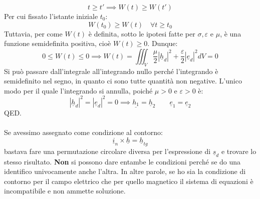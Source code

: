 \documentclass{book}
\begin{document}
        \begin{equation}
            t \geq t' \implies W(t) \geq W(t')
        \end{equation}
        Per cui fissato l'istante iniziale $t_{0}$:
        \begin{equation}
            W(t_{0}) \geq W(t) \quad \forall t \geq t_{0}
        \end{equation}
        Tuttavia, per come $W(t)$ è definita, sotto le ipotesi fatte per $\sigma, \varepsilon$ e $\mu$, è una funzione semidefinita positiva, cioè $W(t) \geq 0$. Dunque:
        \begin{equation}
            0 \leq W(t) \leq 0 \implies W(t) = \iiint_{V} \frac{\mu}{2}|\underline{h}_{d}|^{2}+\frac{\varepsilon}{2}|\underline{e}_{d}|^{2}dV = 0
        \end{equation}
        Si può passare dall'integrale all'integrando nullo perché l'integrando è semidefinito nel segno, in quanto ci sono tutte quantità non negative. L'unico modo per il quale l'integrando si annulla, poiché $\mu >0$ e $\varepsilon>0$ è:
        \begin{equation}
            |\underline{h}_{d}|^{2} = |\underline{e}_{d}|^{2} = 0 \implies \underline{h_{1}}=\underline{h}_{2} \qquad \underline{e}_{1} = \underline{e}_{2}
        \end{equation}
        QED. \\ \\
        Se avessimo assegnato come condizione al contorno:
        \begin{equation}
            \underline{i}_{n} \times \underline{h} = \underline{h}_{tg}
        \end{equation}
        bastava fare una permutazione circolare diversa per l'espressione di $\underline{s}_{d}$ e trovare lo stesso risultato. \textbf{Non} si possono dare entambe le condizioni perché se do una identifico univocamente anche l'altra. In altre parole, se ho sia la condizione di contorno per il campo elettrico che per quello magnetico il sistema di equazioni è incompatibile e non ammette soluzione.
        \newpage
\end{document}
